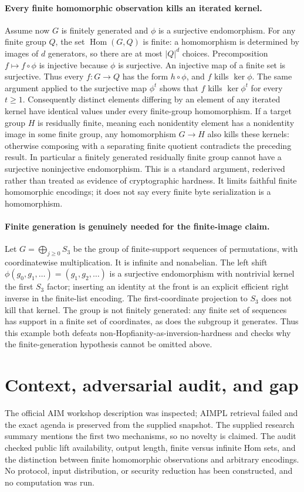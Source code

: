 \documentclass[11pt]{article}
\begin{document}
\paragraph{Every finite homomorphic observation kills an iterated kernel.}
Assume now $G$ is finitely generated and $\phi$ is a surjective endomorphism.
For any finite group $Q$, the set $\operatorname{Hom}(G,Q)$ is finite:
a homomorphism is determined by images of $d$ generators, so there are at
most $|Q|^d$ choices. Precomposition
$f\mapsto f\circ\phi$ is injective because $\phi$ is surjective.
An injective map of a finite set is surjective. Thus every $f:G\to Q$
has the form $h\circ\phi$, and $f$ kills $\ker\phi$.
The same argument applied to the surjective map $\phi^t$ shows that $f$
kills $\ker\phi^t$ for every $t\ge1$.
Consequently distinct elements differing by an element of any iterated kernel
have identical values under every finite-group homomorphism. If a target group
$H$ is residually finite, meaning each nonidentity element has a nonidentity
image in some finite group, any homomorphism $G\to H$ also kills these
kernels: otherwise composing with a separating finite quotient contradicts
the preceding result. In particular a finitely generated residually finite
group cannot have a surjective noninjective endomorphism.
This is a standard argument, rederived rather than treated as evidence of
cryptographic hardness. It limits faithful finite homomorphic encodings; it
does not say every finite byte serialization is a homomorphism.

\paragraph{Finite generation is genuinely needed for the finite-image claim.}
Let $G=\bigoplus_{j\ge0} S_3$ be the group of finite-support sequences of
permutations, with coordinatewise multiplication. It is infinite and nonabelian.
The left shift $\phi(g_0,g_1,\ldots)=(g_1,g_2,\ldots)$ is a surjective
endomorphism with nontrivial kernel the first $S_3$ factor; inserting an identity
at the front is an explicit efficient right inverse in the finite-list encoding.
The first-coordinate projection to $S_3$ does not kill that kernel.
The group is not finitely generated: any finite set of sequences has support
in a finite set of coordinates, as does the subgroup it generates.
Thus this example both defeats non-Hopfianity-as-inversion-hardness and checks
why the finite-generation hypothesis cannot be omitted above.

\section{Context, adversarial audit, and gap}
The official AIM workshop description was inspected; AIMPL retrieval failed
and the exact agenda is preserved from the supplied snapshot. The supplied
research summary mentions the first two mechanisms, so no novelty is claimed.
The audit checked public lift availability, output length, finite versus
infinite Hom sets, and the distinction between finite homomorphic observations
and arbitrary encodings. No protocol, input distribution, or security reduction
has been constructed, and no computation was run.
\end{document}
